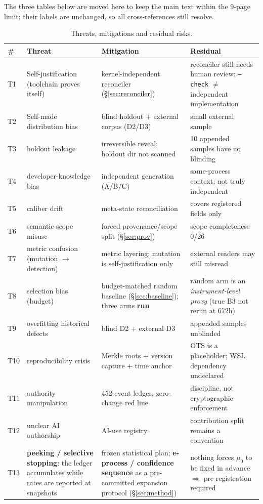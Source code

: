 \documentclass{article}
\begin{document}
The three tables below are moved here to keep the main text within the 9-page limit; their labels are unchanged, so all cross-references still resolve.

\begin{table}[t]
\caption{Threats, mitigations and residual risks.}
\label{tab:threats}
\centering
\small
\begin{tabular}{@{}p{0.5cm}p{4.6cm}p{4.2cm}p{4.6cm}@{}}
\toprule
\# & Threat & Mitigation & Residual \\
\midrule
T1 & Self-justification (toolchain proves itself) & kernel-independent reconciler (\S\ref{sec:reconciler}) & reconciler still needs human review; \texttt{--check} $\neq$ independent implementation \\
T2 & Self-made distribution bias & blind holdout + external corpus (D2/D3) & small external sample \\
T3 & holdout leakage & irreversible reveal; holdout dir not scanned & 10 appended samples have no blinding \\
T4 & developer-knowledge bias & independent generation (A/B/C) & same-process context; not truly independent \\
T5 & caliber drift & meta-state reconciliation & covers registered fields only \\
T6 & semantic-scope misuse & forced provenance/scope split (\S\ref{sec:prov}) & scope completeness 0/26 \\
T7 & metric confusion (mutation $\to$ detection) & metric layering; mutation is self-justification only & external readers may still misread \\
T8 & selection bias (budget) & budget-matched random baseline (\S\ref{sec:baseline}); three arms \textbf{run} & random arm is an \emph{instrument-level proxy} (true B3 not rerun at 672h) \\
T9 & overfitting historical defects & blind D2 + external D3 & appended samples unblinded \\
T10 & reproducibility crisis & Merkle roots + version capture + time anchor & OTS is a placeholder; WSL dependency undeclared \\
T11 & authority manipulation & 452-event ledger, zero-change red line & discipline, not cryptographic enforcement \\
T12 & unclear AI authorship & AI-use registry & contribution split remains a convention \\
T13 & \textbf{peeking / selective stopping}: the ledger accumulates while rates are reported at snapshots & frozen statistical plan; \textbf{e-process / confidence sequence} as a pre-committed expansion protocol (\S\ref{sec:method}) & nothing forces $\mu_0$ to be fixed in advance $\Rightarrow$ pre-registration required \\

\end{tabular}
\end{table}
\end{document}
